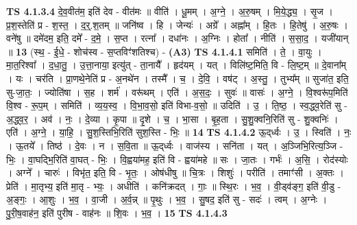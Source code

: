 \documentclass[17pt]{extarticle}
\begin{document}
                  \newline
                                \textbf{ TS 4.1.3.4} \newline
                  दे॒व॒वीत॑म॒ इति॑ देव - वीत॑मः ॥ वीति॑ । धू॒मम् । अ॒ग्ने॒ । अ॒रु॒षम् । मि॒ये॒द्ध्य॒ । सृ॒ज । प्र॒श॒स्तेति॑ प्र - श॒स्त॒ । द॒र्॒.श॒तम् ॥ जनि॑ष्व । हि । जेन्यः॑ । अग्रे᳚ । अह्ना᳚म् । हि॒तः । हि॒तेषु॑ । अ॒रु॒षः । वने॑षु ॥ दमे॑दम॒ इति॒ दमे᳚ - द॒मे॒ । स॒प्त । रत्ना᳚ । दधा॑नः । अ॒ग्निः । होता᳚ । नीति॑ । स॒सा॒द॒ । यजी॑यान् ॥ \textbf{  13} \newline
                  \newline
                      (स्थ॒ - ई॒धे॒ - शोच॑स्व - स॒प्तविꣳ॑शतिश्च) -  \textbf{(A3)} \newline \newline
                                \textbf{ TS 4.1.4.1} \newline
                  समिति॑ । ते॒ । वा॒युः । मा॒त॒रिश्वा᳚ । द॒धा॒तु॒ । उ॒त्ता॒नाया॒ इत्यु॑त् - ता॒नायै᳚ । हृद॑यम् । यत् । विलि॑ष्ट॒मिति॒ वि - लि॒ष्ट॒म् ॥ दे॒वाना᳚म् । यः । चर॑ति । प्रा॒णथे॒नेति॑ प्र - अ॒नथे॑न । तस्मै᳚ । च॒ । दे॒वि॒ । वष॑ट् । अ॒स्तु॒ । तुभ्य᳚म् ॥ सुजा॑त॒ इति॒ सु-जा॒तः॒ । ज्योति॑षा । स॒ह । शर्म॑ । वरू॑थम् । एति॑ । अ॒स॒दः॒ । सुवः॑ ॥ वासः॑ । अ॒ग्ने॒ । वि॒श्वरू॑प॒मिति॑ वि॒श्व - रू॒प॒म् । समिति॑ । व्य॒य॒स्व॒ । वि॒भा॒व॒सो॒ इति॑ विभा-व॒सो॒ ॥ उदिति॑ । उ॒ । ति॒ष्ठ॒ । स्व॒द्ध्व॒रेति॑ सु - अ॒द्ध्व॒र॒ । अव॑ । नः॒ । दे॒व्या । कृ॒पा ॥ दृ॒शे । च॒ । भा॒सा । बृ॒ह॒ता । सु॒शु॒क्वनि॒रिति॑ सु - शु॒क्वनिः॑ । एति॑ । अ॒ग्ने॒ । या॒हि॒ । सु॒श॒स्तिभि॒रिति॑ सुश॒स्ति - भिः॒ ॥ \textbf{  14} \newline
                  \newline
                                \textbf{ TS 4.1.4.2} \newline
                  ऊ॒द्‌र्ध्वः । उ॒ । स्विति॑ । नः॒ । ऊ॒तये᳚ । तिष्ठ॑ । दे॒वः । न । स॒वि॒ता ॥ ऊ॒द्‌र्ध्वः । वाज॑स्य । सनि॑ता । यत् । अ॒ञ्जिभि॒रित्य॒ञ्जि - भिः॒ । वा॒घद्भि॒रिति॑ वा॒घत् - भिः॒ । वि॒ह्वया॑मह॒ इति॑ वि - ह्वया॑महे ॥ सः । जा॒तः । गर्भः॑ । अ॒सि॒ । रोद॑स्योः । अग्ने᳚ । चारुः॑ । विभृ॑त॒ इति॒ वि - भृ॒तः॒ । ओष॑धीषु ॥ चि॒त्रः । शिशुः॑ । परीति॑ । तमाꣳ॑सी । अ॒क्तः । प्रेति॑ । मा॒तृभ्य॒ इति॑ मा॒तृ - भ्यः॒ । अधीति॑ । कनि॑क्रदत् । गाः॒ ॥ स्थि॒रः । भ॒व॒ । वी॒ड्व॑ङ्ग॒ इति॑ वी॒डु - अ॒ङ्गः॒ । आ॒शुः । भ॒व॒ । वा॒जी । अ॒र्व॒न्न् ॥ पृ॒थुः । भ॒व॒ । सु॒षद॒ इति॑ सु - सदः॑ । त्वम् । अ॒ग्नेः । पु॒री॒ष॒वाह॑न॒ इति॑ पुरीष - वाह॑नः ॥ शि॒वः । भ॒व॒ । \textbf{  15 } \newline
                  \newline
                                \textbf{ TS 4.1.4.3} \newline
\end{document}
